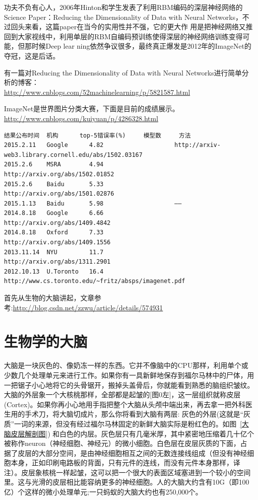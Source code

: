 功夫不负有心人，2006年Hinton和学生发表了利用RBM编码的深层神经网络的Science Paper：Reducing the
Dimensionality of Data with Neural Networks，不过回头来看，这篇paper在当今的实用性并不强，它的更大作
用是把神经网络又推回到大家视线中，利用单层的RBM自编码预训练使得深层的神经网络训练变得可能，但那时候Deep lear
ning依然争议很多，最终真正爆发是2012年的ImageNet的夺冠，这是后话。

有一篇对Reducing the Dimensionality of Data with Neural Networks进行简单分析的博客：\\
\url{http://www.cnblogs.com/52machinelearning/p/5821587.html}

ImageNet是世界图片分类大赛，下面是目前的成绩展示。\url{http://www.cnblogs.com/kuiyuan/p/4286328.html}
\begin{verbatim}
结果公布时间 	机构		top-5错误率(%) 	模型数 	方法
2015.2.11 	Google 		4.82 	  				http://arxiv-web3.library.cornell.edu/abs/1502.03167
2015.2.6 	MSRA 		4.94 	  				http://arxiv.org/abs/1502.01852
2015.2.6 	Baidu 		5.33 	  				http://arxiv.org/abs/1501.02876
2015.1.13 	Baidu 		5.98 	  				——
2014.8.18 	Google 		6.66 	  				http://arxiv.org/abs/1409.4842
2014.8.18 	Oxford 		7.33 	 			 	http://arxiv.org/abs/1409.1556
2013.11.14 	NYU 		11.7 	  				http://arxiv.org/abs/1311.2901
2012.10.13 	U.Toronto 	16.4 	  				http://www.cs.toronto.edu/~fritz/absps/imagenet.pdf
\end{verbatim}


首先从生物的大脑讲起，文章参考:\url{http://blog.csdn.net/zzwu/article/details/574931}
\section{生物学的大脑}
大脑是一块灰色的、像奶冻一样的东西。它并不像脑中的CPU那样，利用单个或少数几个处理单元来进行工作。如果你有一具新鲜地保存到福尔马林中的尸体，用一把锯子小心地将它的头骨锯开，搬掉头盖骨后，你就能看到熟悉的脑组织皱纹。大脑的外层象一个大核桃那样，全部都是起皱的[图0左]，这一层组织就称皮层(Cortex)。如果你再小心地用手指把整个大脑从头颅中端出来，再去拿一把外科医生用的手术刀，将大脑切成片，那么你将看到大脑有两层: 灰色的外层(这就是“灰质”一词的来源，但没有经过福尔马林固定的新鲜大脑实际是粉红色的。如图~\ref{大脑皮层解剖图}) 和白色的内层。灰色层只有几毫米厚，其中紧密地压缩着几十亿个被称作neuron（神经细胞、神经元）的微小细胞。白色层在皮层灰质的下面，占据了皮层的大部分空间，是由神经细胞相互之间的无数连接线组成（但没有神经细胞本身，正如印刷电路板的背面，只有元件的连线，而没有元件本身那样，译注）。皮层象核桃一样起皱，这可以把一个很大的表面区域塞进到一个较小的空间里。这与光滑的皮层相比能容纳更多的神经细胞。人的大脑大约含有10G（即100亿）个这样的微小处理单元;一只蚂蚁的大脑大约也有250,000个。


